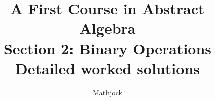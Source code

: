 
\title{\textbf{A First Course in Abstract Algebra}\\[0.3em]Section 2: Binary Operations\\[0.3em]\large Detailed worked solutions}
\author{Mathjock}
\date{}

\maketitle
\bookinfo
\tableofcontents
\clearpage
\renewcommand{\thesection}{2}
\renewcommand{\theHsection}{fraleigh.2}


